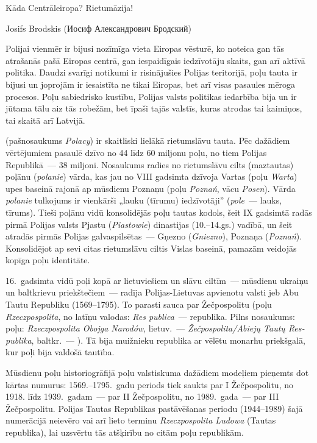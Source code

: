 \documentclass[twoside,a5paper,12pt,fleqn,openany]{extbook}
\newcommand{\pltxti}[1]{\textit{\textpolish{#1}}}
\newcommand{\rutxti}[1]{\textrussian{#1}}
\newcommand{\detxti}[1]{\textit{\textgerman{#1}}}
\newcommand{\lttxti}[1]{\textit{\textlithuanian{#1}}}
\newcommand{\latxti}[1]{\textit{\textlatin{#1}}}
\newcommand{\betxti}[1]{\textbelarusian{#1}}
\begin{document}
\epigraph
{Kāda Centrāleiropa? Rietumāzija!}
{Josifs Brodskis (\rutxti{Иосиф Александрович Бродский})}

Polijai vienmēr ir bijusi nozīmīga vieta Eiropas vēsturē, ko noteica gan tās atrašanās pašā Eiropas centrā, gan iespaidīgais iedzīvotāju skaits, gan arī aktīvā politika. Daudzi svarīgi notikumi ir risinājušies Polijas teritorijā, poļu tauta ir bijusi un joprojām ir iesaistīta ne tikai Eiropas, bet arī visas pasaules mēroga procesos. Poļu sabiedrisko kustību, Polijas valsts politikas iedarbība bija un ir jūtama tālu aiz tās robežām, bet īpaši tajās valstīs, kuras atrodas tai kaimiņos, tai skaitā arī Latvijā.

 (pašnosaukums \pltxti{Polacy}) ir skaitliski lielākā rietumslāvu tauta. Pēc dažādiem vērtējumiem pasaulē dzīvo no 44 līdz 60 miljonu poļu, no tiem Polijas Republikā~--- 38 miljoni. Nosaukums radies no rietumslāvu cilts (maztautas) poļānu (\pltxti{polanie}) vārda, kas jau no VIII gadsimta dzīvoja Vartas (poļu \pltxti{Warta}) upes baseinā rajonā ap mūsdienu Poznaņu (poļu \pltxti{Poznań}, vācu \detxti{Posen}). Vārda \pltxti{polanie} tulkojums ir vienkārši „lauku (tīrumu) iedzīvotāji” (\pltxti{pole}~--- lauks, tīrums). Tieši poļānu vidū konsolidējās poļu tautas kodols, šeit IX gadsimtā radās pirmā Polijas valsts Pjastu (\pltxti{Piastowie}) dinastijas (10.--14.gs.) vadībā, un šeit atradās pirmās Polijas galvaspilsētas~--- Gņezno (\pltxti{Gniezno}), Poznaņa (\pltxti{Poznań}). Konsolidējot ap sevi citas rietumslāvu ciltis Vislas baseinā, pamazām veidojās kopīga poļu identitāte.

16.~gadsimta vidū poļi kopā ar lietuviešiem un slāvu ciltīm~--- mūsdienu ukraiņu un baltkrievu priekštečiem~--- radīja Polijas-Lietuvas apvienotu valsti jeb Abu Tautu Republiku (1569--1795). To parasti sauca par Žečpospolitu (poļu \pltxti{Rzeczpospolita}, no latīņu valodas: \latxti{Res publica}~--- republika. Pilns nosaukums: poļu: \pltxti{Rzeczpospolita Obojga Narodów}, lietuv.~--- \lttxti{Žečpospolita/Abiejų Tautų Respublika}, baltkr.~--- \betxti{Рэч Паспалітая Абодвух Народаў}). Tā bija muižnieku republika ar vēlētu monarhu priekšgalā, kur poļi bija valdošā tautība.

Mūsdienu poļu historiogrāfijā poļu valstiskuma dažādiem modeļiem pieņemts dot kārtas numurus: 1569.--1795.~gadu periods tiek saukts par I Žečpospolitu, no 1918. līdz 1939.~gadam~--- par II Žečpospolitu, no 1989.~gada~--- par III Žečpospolitu. Polijas Tautas Republikas pastāvēšanas periodu (1944--1989) šajā numerācijā neievēro vai arī lieto terminu \pltxti{Rzeczpospolita Ludowa} (Tautas republika), lai uzsvērtu tās atšķirību no citām poļu republikām.
\end{document}
